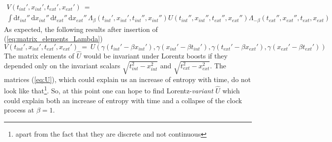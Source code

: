 \documentclass[12pt]{article}
\begin{document}
\begin{equation}
\begin{gathered}
V(t_{int}',x_{int}',t_{ext}',x_{ext}')\ =\ \\
\int \mathrm{d}t_{int}''\,\mathrm{d}x_{int}''\, \mathrm{d}t_{ext}''\,\mathrm{d}x_{ext}''\, 
\Lambda_\beta(t_{int}',x_{int}',t_{int}'',x_{int}'') 
U(t_{int}'',x_{int}'',t_{ext}'',x_{ext}'') 
\Lambda_{-\beta}(t_{ext}'',x_{ext}'',t_{ext},x_{ext})
\end{gathered}
\end{equation}
As expected, the following results after insertion of (\ref{eq:matrix_elements_Lambda})
\begin{equation}
V(t_{int}',x_{int}',t_{ext}',x_{ext}')\ =\ 
U(\gamma(t_{int}'-\beta x_{int}'),
\gamma(x_{int}'-\beta t_{int}'),
\gamma(t_{ext}'-\beta x_{ext}'),
\gamma(x_{ext}'-\beta t_{ext}')) 
\end{equation}
The matrix elements of $\hat{U}$ would be invariant under Lorentz boosts if they depended only on the invariant scalars $\sqrt{t_{int}^2-x_{int}^2}$ and $\sqrt{t_{ext}^2-x_{ext}^2}$. The matrices (\ref{eq:U}), which could explain us an increase of entropy with time, do not look like that\footnote{apart from the fact that they are discrete and not continuous}. So, at this point one can hope to find Lorentz-\emph{variant} $\hat{U}$ which could explain both an increase of entropy with time and a collapse of the clock process at $\beta=1$.



\end{document}
